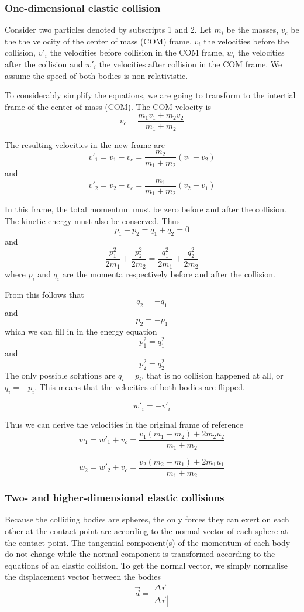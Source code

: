 \subsubsection{One-dimensional elastic collision}

Consider two particles denoted by subscripts 1 and 2.  Let $m_i$ be the masses, 
$v_c$ be the the velocity of the center of mass (COM) frame, $v_i$ the 
velocities before the collision, $v'_i$ the velocities before collision in the 
COM frame, $w_i$ the velocities after the collision and $w'_i$ the velocities 
after collision in the COM frame.  We assume the speed of both bodies is 
non-relativistic. 

To considerably simplify the equations, we are going to transform to the 
intertial frame of the center of mass (COM). The COM velocity is
$$
v_c = \frac{m_1 v_1 + m_2 v_2}{m_1 + m_2}
$$

The resulting velocities in the new frame are
$$
v'_1 = v_1 - v_c = \frac{m_2}{m_1+m_2}(v_1-v_2)
$$
and
$$
v'_2 = v_2 - v_c = \frac{m_1}{m_1+m_2}(v_2-v_1)
$$

In this frame, the total momentum must be zero before and after the collision.  
The kinetic energy must also be conserved.
Thus
$$
p_1 + p_2 = q_1 + q_2 = 0
$$
and
$$
\frac{p_1^2}{2m_1} + \frac{p_2^2}{2m_2} = \frac{q_1^2}{2m_1} + 
\frac{q_2^2}{2m_2}
$$
where $p_i$ and $q_i$ are the momenta respectively before and after the 
collision.

From this follows that
$$
q_2 = -q_1
$$
and
$$
p_2 = -p_1
$$
which we can fill in in the energy equation
$$
p_1^2 = q_1^2
$$
and
$$
p_2^2 = q_2^2
$$
The only possible solutions are $q_i = p_i$, that is no collision happened at 
all, or $q_i = -p_i$. This means that the velocities of both bodies are 
flipped.

$$
w'_i = -v'_i
$$

Thus we can derive the velocities in the original frame of reference
$$
w_1 = w'_1 + v_c = \frac{v_1(m_1-m_2) + 2m_2u_2}{m_1+m_2}
$$

$$
w_2 = w'_2 + v_c = \frac{v_2(m_2-m_1) + 2m_1u_1}{m_1+m_2}
$$

\subsubsection{Two- and higher-dimensional elastic collisions}
Because the colliding bodies are spheres, the only forces they can exert on 
each other at the contact point are according to the normal vector of each 
sphere at the contact point. The tangential component(s) of the momentum of 
each body do not change while the normal component is transformed according to 
the equations of an elastic collision. To get the normal vector, we simply 
normalise the displacement vector between the bodies
$$
\vec{d} = \frac{\Delta\vec{r}}{|\Delta\vec{r}|}
$$

